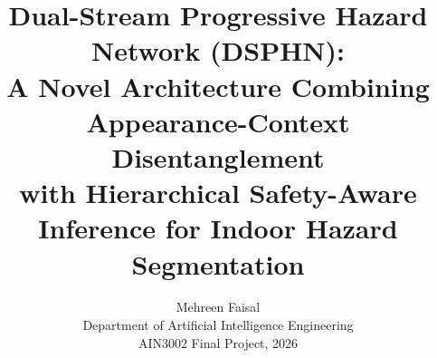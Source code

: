 \documentclass[10pt,twocolumn,letterpaper]{article}
\title{Dual-Stream Progressive Hazard Network (DSPHN):\\
A Novel Architecture Combining Appearance-Context Disentanglement\\
with Hierarchical Safety-Aware Inference for Indoor Hazard Segmentation}
\author{Mehreen Faisal\\
Department of Artificial Intelligence Engineering\\
AIN3002 Final Project, 2026
}
\begin{document}
\maketitle






{
    \small
    
    
}
\end{document}
